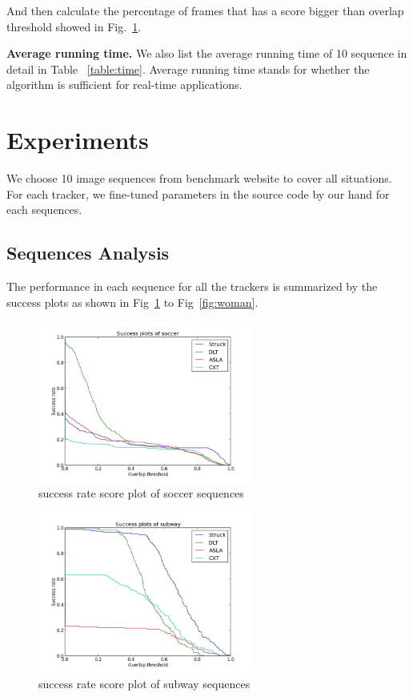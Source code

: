 \documentclass{acm_proc_article-sp}
\begin{document}
And then calculate the percentage of frames that has a score bigger than overlap threshold showed in Fig.~\ref{fig:soccer}.

\textbf{Average running time.}
We also list the average running time of 10 sequence in detail in Table ~\ref{table:time}. Average running time stands for whether the algorithm is sufficient for real-time applications.


\section{Experiments}

We choose 10 image sequences from benchmark website \cite{dataset} to cover all situations.
For each tracker, we fine-tuned parameters in the source code by our hand for each sequences.

\subsection{Sequences Analysis}

The performance in each sequence for all the trackers is summarized by the success plots as shown in Fig~\ref{fig:soccer} to Fig~\ref{fig:woman}.

\begin{figure}[hbt]
    \includegraphics[width=200pt]{soccer.jpg}
    \caption{success rate score plot of soccer sequences}
    \label{fig:soccer}
\end{figure}

\begin{figure}[hbt]
    \includegraphics[width=200pt]{subway.jpg}
    \caption{success rate score plot of subway sequences}
    \label{fig:subway}
\end{figure}
\end{document}
